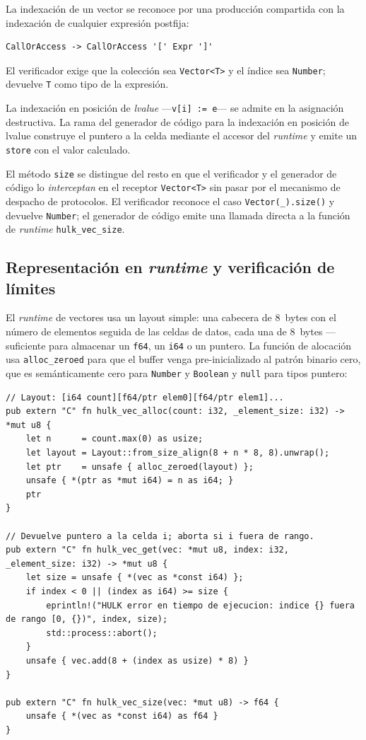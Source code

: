 \documentclass[11pt,a4paper,oneside,openany]{report}
\newcommand{\code}[1]{\texttt{#1}}
\begin{document}
La indexación de un vector se reconoce por una producción compartida con
la indexación de cualquier expresión postfija:

\begin{lstlisting}[style=bnf]
CallOrAccess -> CallOrAccess '[' Expr ']'
\end{lstlisting}

El verificador exige que la colección sea \code{Vector<T>} y el índice sea
\code{Number}; devuelve \code{T} como tipo de la expresión.

La indexación en posición de \emph{lvalue} ---\code{v[i] := e}--- se
admite en la asignación destructiva. La rama del generador de código para
la indexación en posición de lvalue construye el puntero a la celda
mediante el accesor del \textit{runtime} y emite un \code{store} con el
valor calculado.

El método \code{size} se distingue del resto en que el verificador y el
generador de código lo \emph{interceptan} en el receptor \code{Vector<T>}
sin pasar por el mecanismo de despacho de protocolos. El verificador
reconoce el caso \code{Vector(\_).size()} y devuelve \code{Number}; el
generador de código emite una llamada directa a la función de \textit{runtime}
\code{hulk\_vec\_size}.

\subsection{Representación en \textit{runtime} y verificación de límites}

El \textit{runtime} de vectores usa un layout simple: una cabecera de
8~bytes con el número de elementos seguida de las celdas de datos, cada
una de 8~bytes ---suficiente para almacenar un \code{f64}, un \code{i64} o
un puntero. La función de alocación usa \code{alloc\_zeroed} para que el
buffer venga pre-inicializado al patrón binario cero, que es
semánticamente cero para \code{Number} y \code{Boolean} y \code{null} para
tipos puntero:

\begin{lstlisting}[style=rustst, caption={Runtime de vectores: alocación, indexación, tamaño.}, label={lst:rt-vec}]
// Layout: [i64 count][f64/ptr elem0][f64/ptr elem1]...
pub extern "C" fn hulk_vec_alloc(count: i32, _element_size: i32) -> *mut u8 {
    let n      = count.max(0) as usize;
    let layout = Layout::from_size_align(8 + n * 8, 8).unwrap();
    let ptr    = unsafe { alloc_zeroed(layout) };
    unsafe { *(ptr as *mut i64) = n as i64; }
    ptr
}

// Devuelve puntero a la celda i; aborta si i fuera de rango.
pub extern "C" fn hulk_vec_get(vec: *mut u8, index: i32, _element_size: i32) -> *mut u8 {
    let size = unsafe { *(vec as *const i64) };
    if index < 0 || (index as i64) >= size {
        eprintln!("HULK error en tiempo de ejecucion: indice {} fuera de rango [0, {})", index, size);
        std::process::abort();
    }
    unsafe { vec.add(8 + (index as usize) * 8) }
}

pub extern "C" fn hulk_vec_size(vec: *mut u8) -> f64 {
    unsafe { *(vec as *const i64) as f64 }
}
\end{lstlisting}
\end{document}
